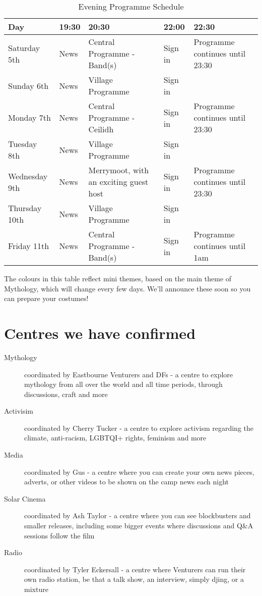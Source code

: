\documentclass[a4paper, 11pt]{report}
\begin{document}
\begin{table}[H]
    \centering
    {\RaggedRight
    \begin{tabular}{p{} p{} p{} p{} p{}}
    \textbf{Day} & \textbf{19:30} & \textbf{20:30} & \textbf{22:00} & \textbf{22:30} \\
    \hline
    Saturday 5th & News & \cellcolor{wcfDarkGreen}Central Programme  - Band(s) & Sign in & \cellcolor{wcfDarkGreen}Programme continues until 23:30 \\
    \hline
    Sunday 6th & News & \cellcolor{wcfGreen}Village Programme & Sign in & \cellcolor{wcfGreen} \\
    \hline
    Monday 7th & News & \cellcolor{wcfGreen}Central Programme - Ceilidh & Sign in & \cellcolor{wcfGreen}Programme continues until 23:30 \\
    \hline
    Tuesday 8th & News & \cellcolor{wcfYellow}Village Programme & Sign in & \cellcolor{wcfYellow} \\
    \hline
    Wednesday 9th & News & \cellcolor{wcfYellow}Merrymoot, with an exciting guest host & Sign in & \cellcolor{wcfYellow}Programme continues until 23:30 \\
    \hline
    Thursday 10th & News & \cellcolor{wcfRed}Village Programme & Sign in & \cellcolor{wcfRed} \\
    \hline
    Friday 11th & News & \cellcolor{wcfRed}Central Programme - Band(s) & Sign in & \cellcolor{wcfRed}Programme continues until 1am\\
    \hline
    \end{tabular}
    }%
    \caption{Evening Programme Schedule}
\end{table}
The colours in this table reflect mini themes, based on the main theme of Mythology, which will change every few days. We'll announce these soon so you can prepare your costumes! 

\section{Centres we have confirmed}
\begin{description}
    \item[Mythology] coordinated by Eastbourne Venturers and DFs - a centre to explore mythology from all over the world and all time periods, through discussions, craft and more
    \item[Activisim] coordinated by Cherry Tucker - a centre to explore activism regarding the climate, anti-racism, LGBTQI+ rights, feminism and more
    \item[Media] coordinated by Gus - a centre where you can create your own news pieces, adverts, or other videos to be shown on the camp news each night
    \item[Solar Cinema]  coordinated by Ash Taylor - a centre where you can see blockbusters and smaller releases, including some bigger events where discussions and Q\&A sessions follow the film
    \item[Radio]  coordinated by Tyler Eckersall - a centre where Venturers can run their own radio station, be that a talk show, an interview, simply djing, or a mixture
\end{description}
\end{document}
